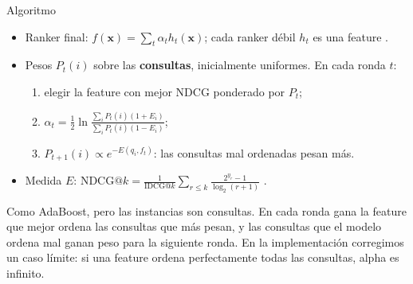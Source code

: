 \documentclass{beamer}
\begin{document}
\begin{frame}{Algoritmo}
    \begin{itemize}
        \item Ranker final: $f(\mathbf{x})=\sum_t \alpha_t h_t(\mathbf{x})$; cada ranker débil $h_t$ es una feature \citep{xu2007adarank}.
        \item Pesos $P_t(i)$ sobre las \textbf{consultas}, inicialmente uniformes. En cada ronda $t$:
        \begin{enumerate}
            \item elegir la feature con mejor NDCG ponderado por $P_t$;
            \item $\alpha_t=\frac12\ln\frac{\sum_i P_t(i)(1+E_i)}{\sum_i P_t(i)(1-E_i)}$;
            \item $P_{t+1}(i)\propto e^{-E(q_i,f_t)}$: las consultas mal ordenadas pesan más.
        \end{enumerate}
        \item Medida $E$: $\mathrm{NDCG@}k=\frac{1}{\mathrm{IDCG@}k}\sum_{r\le k}\frac{2^{y_r}-1}{\log_2(r+1)}$ \citep{jarvelin2002}.
    \end{itemize}

    \begin{note}
        {Como AdaBoost, pero las instancias son consultas. En cada ronda gana la feature que mejor ordena las consultas
        que más pesan, y las consultas que el modelo ordena mal ganan peso para la siguiente ronda.
        En la implementación corregimos un caso límite: si una feature ordena perfectamente todas las consultas, alpha es infinito.}
    \end{note}
\end{frame}
\end{document}

